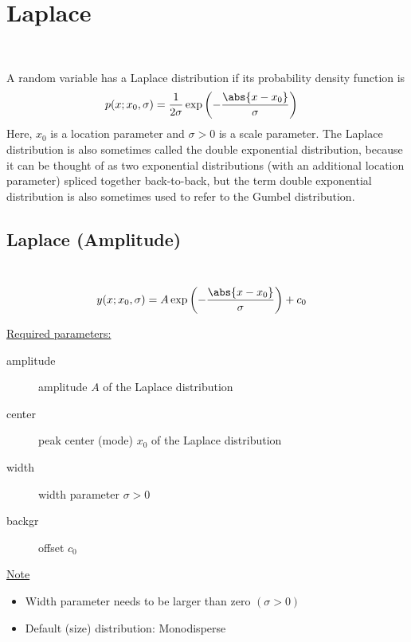 \section{Laplace} ~\\
\label{sec:Laplace}

A random variable has a Laplace
distribution if its probability density function is
\begin{align}
p(x;x_0,\sigma) &= \frac{1}{2\sigma} \exp \left(
-\frac{\abs{x-x_0}}{\sigma}\right)
\end{align}
Here, $x_0$ is a location parameter and $\sigma > 0$ is a scale
parameter. The Laplace distribution is also sometimes called the
double exponential distribution, because it can be thought of as two
exponential distributions (with an additional location parameter)
spliced together back-to-back, but the term double exponential
distribution is also sometimes used to refer to the Gumbel
distribution.

\vspace{1cm}
\subsection{Laplace (Amplitude)} ~\\
\label{sec:LaplaceAmplitude}
\begin{align}
y(x;x_0,\sigma) &= A \exp \left(
-\frac{\abs{x-x_0}}{\sigma}\right) + c_0
\end{align}


\underline{Required parameters:}
\begin{description}
    \item[amplitude] amplitude $A$ of the Laplace distribution
    \item[center] peak center (mode) $x_0$ of the Laplace distribution
    \item[width] width parameter $\sigma>0$
    \item[backgr] offset $c_0$
\end{description}

\underline{Note}
\begin{itemize}
  \item Width parameter needs to be larger than zero $(\sigma>0)$
  \item Default (size) distribution: Monodisperse
\end{itemize}

